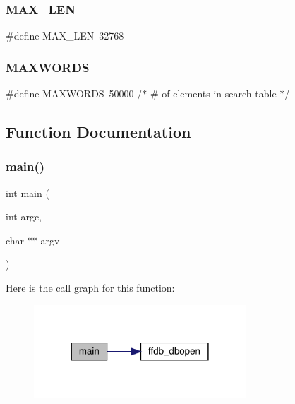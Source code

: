 \subsubsection{\texorpdfstring{MAX\_LEN}{MAX\_LEN}}
{\footnotesize\ttfamily \#define M\+A\+X\+\_\+\+L\+EN~32768}

\mbox{\label{adat-devel_2other__libs_2filedb_2filehash_2tkeyseq_8c_aa6b319146daf33409da1bbe4194553dc}} 
\subsubsection{\texorpdfstring{MAXWORDS}{MAXWORDS}}
{\footnotesize\ttfamily \#define M\+A\+X\+W\+O\+R\+DS~50000	       /$\ast$ \# of elements in search table $\ast$/}



\subsection{Function Documentation}
\mbox{\label{adat-devel_2other__libs_2filedb_2filehash_2tkeyseq_8c_a3c04138a5bfe5d72780bb7e82a18e627}} 
\subsubsection{\texorpdfstring{main()}{main()}}
{\footnotesize\ttfamily int main (\begin{DoxyParamCaption}\item[{int}]{argc,  }\item[{char $\ast$$\ast$}]{argv }\end{DoxyParamCaption})}

Here is the call graph for this function\+:
\nopagebreak
\begin{figure}[H]
\begin{center}
\leavevmode
\includegraphics[width=225pt]{db/dbf/adat-devel_2other__libs_2filedb_2filehash_2tkeyseq_8c_a3c04138a5bfe5d72780bb7e82a18e627_cgraph}
\end{center}
\end{figure}
